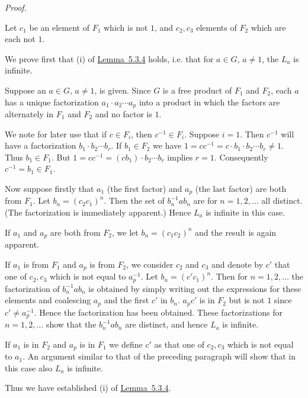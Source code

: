 \documentclass[b5paper,twoside]{article}
\newcommand{\lemref}[2]{\hyperref[#1]{\mbox{Lemma~#2}}}
\theoremstyle{mvnplain}
\renewenvironment{proof}[1][Proof]{%
  \par\addvspace{0.35\baselineskip}%
  \noindent\textit{#1.}\ \normalfont\ignorespaces
}{%
  \par\addvspace{0.35\baselineskip}%
}
\def\mathfrak#1{#1}%
\begin{document}
\begin{proof}
Let $c_1$ be an element of $\mathfrak F_1$ which is not $1$, and $c_2,c_3$
elements of $\mathfrak F_2$ which are each not $1$.

We prove first that (i) of \lemref{lem:5.3.4}{5.3.4} holds, i.e. that for
$a\in\mathfrak G$, $a\ne1$, the $\mathfrak L_a$ is infinite.

Suppose an $a\in\mathfrak G$, $a\ne1$, is given. Since $\mathfrak G$ is a
free product of $\mathfrak F_1$ and $\mathfrak F_2$, each $a$ has a unique
factorization $a_1\cdot a_2\cdots a_p$ into a product in which the factors are
alternately in $\mathfrak F_1$ and $\mathfrak F_2$ and no factor is $1$.

We note for later use that if $c\in\mathfrak F_i$, then
$c^{-1}\in\mathfrak F_i$. Suppose $i=1$. Then $c^{-1}$ will have a
factorization $b_1\cdot b_2\cdots b_r$. If $b_1\in\mathfrak F_2$ we have
$1=cc^{-1}=c\cdot b_1\cdot b_2\cdots b_r\ne1$. Thus
$b_1\in\mathfrak F_1$. But $1=cc^{-1}=(cb_1)\cdot b_2\cdots b_r$ implies
$r=1$. Consequently $c^{-1}=b_1\in\mathfrak F_1$.

Now suppose firstly that $a_1$ (the first factor) and $a_p$ (the last factor)
are both from $\mathfrak F_1$. Let $b_n=(c_2c_1)^n$. Then the set of
$b_n^{-1}ab_n$ are for $n=1,2,\ldots$ all distinct. (The factorization is
immediately apparent.) Hence $\mathfrak L_a$ is infinite in this case.

If $a_1$ and $a_p$ are both from $\mathfrak F_2$, we let
$b_n=(c_1c_2)^n$ and the result is again apparent.

If $a_1$ is from $\mathfrak F_1$ and $a_p$ is from $\mathfrak F_2$, we
consider $c_2$ and $c_3$ and denote by $c'$ that one of $c_2,c_3$ which is not
equal to $a_p^{-1}$. Let $b_n=(c'c_1)^n$. Then for $n=1,2,\ldots$ the
factorization of $b_n^{-1}ab_n$ is obtained by simply writing out the
expressions for these elements and coalescing $a_p$ and the first $c'$ in
$b_n$. $a_pc'$ is in $\mathfrak F_2$ but is not $1$ since $c'\ne a_p^{-1}$.
Hence the factorization has been obtained. These factorizations for
$n=1,2,\ldots$ show that the $b_n^{-1}ab_n$ are distinct, and hence
$\mathfrak L_a$ is infinite.

If $a_1$ is in $\mathfrak F_2$ and $a_p$ is in $\mathfrak F_1$ we define
$c'$ as that one of $c_2,c_3$ which is not equal to $a_1$. An argument
similar to that of the preceding paragraph will show that in this case also
$\mathfrak L_a$ is infinite.

Thus we have established (i) of \lemref{lem:5.3.4}{5.3.4}.


\end{proof}
\end{document}
